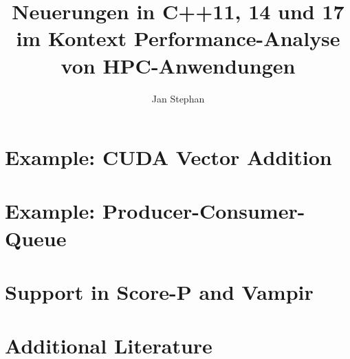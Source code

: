 \documentclass[utf8,hauptseminar]{zihpub}
\author{Jan Stephan}
\title{Neuerungen in C++11, 14 und 17 im Kontext Performance-Analyse von HPC-Anwendungen}
\begin{document}

\section{Example: CUDA Vector Addition} 
\section{Example: Producer-Consumer-Queue}

\section{Support in Score-P and Vampir}

\section{Additional Literature}


{}
\end{document}
